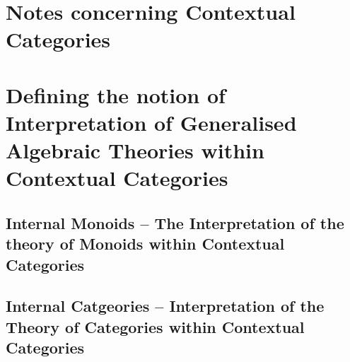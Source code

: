 \documentclass[10pt,a4paper]{article}
\theoremstyle{remark}
\begin{document}
\section{Notes concerning Contextual Categories}

\section{Defining the notion of Interpretation of Generalised Algebraic Theories within Contextual Categories}


\subsection{Internal Monoids -- The Interpretation of the theory of Monoids within Contextual Categories}
 

\subsection{Internal Catgeories -- Interpretation of the Theory of Categories within Contextual Categories}



%

% 


\end{document}
